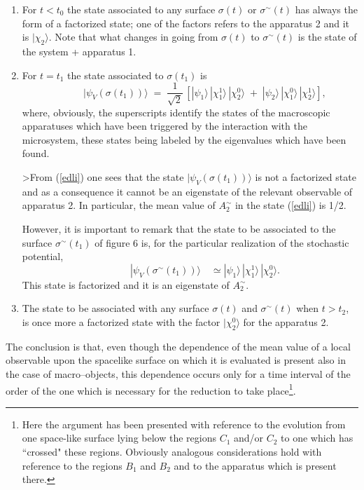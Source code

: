 \documentclass[10pt,a4paper]{article}
\begin{document}
\begin{enumerate}
\item For $t < t_{0}$ the state associated to any surface $\sigma(t)$
or $\sigma^{\sim}(t)$ has always the form of a factorized state;
one of the factors refers to the apparatus 2 and it is
$|\chi_{2}\rangle$. Note that what changes in going from
$\sigma(t)$ to $\sigma^{\sim}(t)$ is the state of the system +
apparatus 1.

\item For $t = t_{1}$ the state associated to $\sigma(t_{1})$ is
\begin{equation} \label{edli}
\qquad\quad |\psi_{V}(\sigma(t_{1}))\rangle \; = \;
\frac{1}{\sqrt{2}}\, [|\psi_{1}\rangle\,
|\chi_{1}^{1}\rangle\,|\chi_{2}^{0}\rangle \; + \;
|\psi_{2}\rangle\, |\chi_{1}^{0}\rangle\, |\chi_{2}^{1}\rangle],
\end{equation}
where, obviously, the superscripts identify the states of the
macroscopic apparatuses which have been triggered by the
interaction with the microsystem, these states being labeled by
the eigenvalues which have been found.

>From (\ref{edli}) one sees that the state
$|\psi_{V}(\sigma(t_{1}))\rangle$ is not a factorized state and as
a consequence it cannot be an eigenstate of the relevant
observable of apparatus 2. In particular, the mean value of
$A_{2}^{\sim}$ in the state (\ref{edli}) is 1/2.

However, it is important to remark that the state to be associated
to the surface $\sigma^{\sim}(t_{1})$ of figure 6 is, for the
particular realization of the stochastic potential,
\begin{equation}
\qquad\quad |\psi_{V}(\sigma^{\sim}(t_{1}))\rangle \quad \simeq
|\psi_{1}\rangle\, |\chi_{1}^{1}\rangle\,|\chi_{2}^{0}\rangle.
\end{equation}
This state is factorized and it is an eigenstate of
$A_{2}^{\sim}$.
\item The state to be associated with any surface $\sigma(t)$ and
$\sigma^{\sim}(t)$ when $t > t_{2}$, is once more a factorized
state with the factor $|\chi_{2}^{0}\rangle$ for the apparatus 2.
\end{enumerate}
The conclusion is that, even though the dependence of the mean
value of a local observable upon the spacelike surface on which it
is evaluated is present also in the case of macro--objects, this
dependence occurs only for a time interval of the order of the one
which is necessary for the reduction to take place\footnote{Here the
argument has been presented with reference to the evolution from one
space-like surface lying below the regions $C_{1}$ and/or $C_{2}$ to one
which has ``crossed" these regions. Obviously analogous considerations
hold with reference to the regions $B_{1}$ and $B_{2}$ and to the
apparatus which is present there.}.
\end{document}
